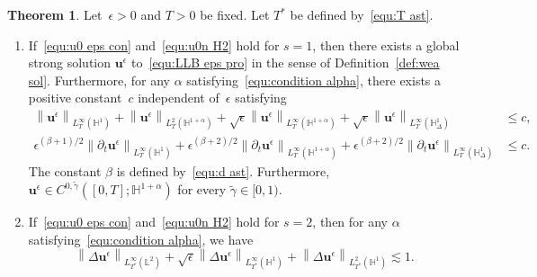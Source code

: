 \documentclass[11pt,reqno]{amsart}
\theoremstyle{definition}
\newtheorem{theorem}{Theorem}[section]
\numberwithin{equation}{section}
\newcommand{\bff}{\boldsymbol}
\newcommand{\bb}{\mathbb}
\newcommand{\pa}{\partial}
\newcommand{\norm}[2]{\left\|{#1}\right\|_{#2}}
\begin{document}
\begin{theorem}\label{the:ue sol}
	Let~$ \epsilon>0 $ and $T>0$ be fixed. Let $T^\ast$ be defined by~\eqref{equ:T ast}.
    \begin{enumerate}
		\renewcommand{\labelenumi}{\theenumi}
		\renewcommand{\theenumi}{{\rm (\roman{enumi})}}
		\item If~\eqref{equ:u0 eps con} and~\eqref{equ:u0n
			H2} hold for $s=1$, then there exists
		a global strong solution $\bff{u}^\epsilon$ to~\eqref{equ:LLB eps pro} in the sense of Definition~\ref{def:wea sol}. Furthermore, for any $\alpha$ satisfying~\eqref{equ:condition alpha}, there exists
		a positive constant~$c$ independent of~$\epsilon$
		satisfying
		\begin{equation}\label{equ:est ue unif 1}
			\begin{aligned}
				\norm{\bff{u}^\epsilon}{L^\infty_T(\bb{H}^1)}
				+
				\norm{\bff{u}^\epsilon}{L^2_T(\bb{H}^{1+\alpha})}
				+
				\sqrt{\epsilon} \norm{\bff{u}^\epsilon}{L^\infty_T(\bb{H}^{1+\alpha})}
				+
				\sqrt{\epsilon} \norm{\bff{u}^\epsilon}{L^\infty_T(\bb{H}^{1}_\Delta)}
				&\le c,
				\\
				\epsilon^{(\beta+1)/2} \norm{\pa_t\bff{u}^\epsilon}{L^\infty_T(\bb{H}^1)}
				+
				\epsilon^{(\beta+2)/2} \norm{\pa_t\bff{u}^\epsilon}{L^\infty_T(\bb{H}^{1+\alpha})}
				+
				\epsilon^{(\beta+2)/2} \norm{\pa_t\bff{u}^\epsilon}{L^\infty_T(\bb{H}^1_\Delta)}
				&\le c.
			\end{aligned}
		\end{equation}
        The constant $\beta$ is defined by~\eqref{equ:d ast}. Furthermore, $\bff{u}^\epsilon\in C^{0,\widetilde{\gamma}}([0,T];\bb{H}^{1+\alpha})$ for every $\widetilde{\gamma}\in [0,1)$.
        \item If~\eqref{equ:u0 eps con} and~\eqref{equ:u0n
			H2} hold for $s=2$, then for any $\alpha$ satisfying~\eqref{equ:condition alpha}, we have
    \begin{equation}\label{equ:ue all app}
		\norm{\Delta \bff{u}^\epsilon}{L^\infty_{T^\ast}(\bb{L}^2)}
        +
        \sqrt{\epsilon} \norm{\Delta \bff{u}^\epsilon}{L^\infty_{T^\ast}(\bb{H}^1)}
		+
		\norm{\Delta \bff{u}^\epsilon}{L^2_{T^\ast}(\bb{H}^1)}
		\lesssim 1.
\end{equation}
    \end{enumerate}
\end{theorem}
\end{document}
